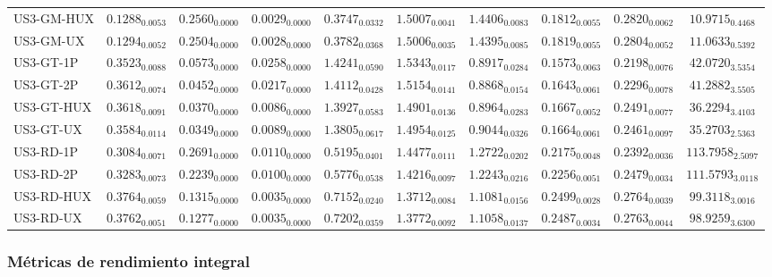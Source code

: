 \begin{longtable}{@{}lccccccccc@{}}
US3-GM-HUX & $0.1288_{0.0053}$ & $0.2560_{0.0000}$ & $0.0029_{0.0000}$ & $0.3747_{0.0332}$ & $1.5007_{0.0041}$ & $1.4406_{0.0083}$ & $0.1812_{0.0055}$ & $0.2820_{0.0062}$ & $10.9715_{0.4468}$ \\
US3-GM-UX & $0.1294_{0.0052}$ & $0.2504_{0.0000}$ & $0.0028_{0.0000}$ & $0.3782_{0.0368}$ & $1.5006_{0.0035}$ & $1.4395_{0.0085}$ & $0.1819_{0.0055}$ & $0.2804_{0.0052}$ & $11.0633_{0.5392}$ \\
US3-GT-1P & $0.3523_{0.0088}$ & $0.0573_{0.0000}$ & $0.0258_{0.0000}$ & $1.4241_{0.0590}$ & $1.5343_{0.0117}$ & $0.8917_{0.0284}$ & $0.1573_{0.0063}$ & $0.2198_{0.0076}$ & $42.0720_{3.5354}$ \\
US3-GT-2P & $0.3612_{0.0074}$ & $0.0452_{0.0000}$ & $0.0217_{0.0000}$ & $1.4112_{0.0428}$ & $1.5154_{0.0141}$ & $0.8868_{0.0154}$ & $0.1643_{0.0061}$ & $0.2296_{0.0078}$ & $41.2882_{3.5505}$ \\
US3-GT-HUX & $0.3618_{0.0091}$ & $0.0370_{0.0000}$ & $0.0086_{0.0000}$ & $1.3927_{0.0583}$ & $1.4901_{0.0136}$ & $0.8964_{0.0283}$ & $0.1667_{0.0052}$ & $0.2491_{0.0077}$ & $36.2294_{3.4103}$ \\
US3-GT-UX & $0.3584_{0.0114}$ & $\mathbf{0.0349}_{0.0000}$ & $0.0089_{0.0000}$ & $1.3805_{0.0617}$ & $1.4954_{0.0125}$ & $0.9044_{0.0326}$ & $0.1664_{0.0061}$ & $0.2461_{0.0097}$ & $35.2703_{2.5363}$ \\
US3-RD-1P & $0.3084_{0.0071}$ & $0.2691_{0.0000}$ & $0.0110_{0.0000}$ & $0.5195_{0.0401}$ & $1.4477_{0.0111}$ & $1.2722_{0.0202}$ & $0.2175_{0.0048}$ & $0.2392_{0.0036}$ & $\mathbf{113.7958}_{2.5097}$ \\
US3-RD-2P & $0.3283_{0.0073}$ & $0.2239_{0.0000}$ & $0.0100_{0.0000}$ & $0.5776_{0.0538}$ & $1.4216_{0.0097}$ & $1.2243_{0.0216}$ & $0.2256_{0.0051}$ & $0.2479_{0.0034}$ & $111.5793_{3.0118}$ \\
US3-RD-HUX & $0.3764_{0.0059}$ & $0.1315_{0.0000}$ & $0.0035_{0.0000}$ & $0.7152_{0.0240}$ & $\mathbf{1.3712}_{0.0084}$ & $1.1081_{0.0156}$ & $\mathbf{0.2499}_{0.0028}$ & $0.2764_{0.0039}$ & $99.3118_{3.0016}$ \\
US3-RD-UX & $0.3762_{0.0051}$ & $0.1277_{0.0000}$ & $0.0035_{0.0000}$ & $0.7202_{0.0359}$ & $1.3772_{0.0092}$ & $1.1058_{0.0137}$ & $0.2487_{0.0034}$ & $0.2763_{0.0044}$ & $98.9259_{3.6300}$ \\
\end{longtable}
\endgroup

\subsubsection{Métricas de rendimiento integral}

